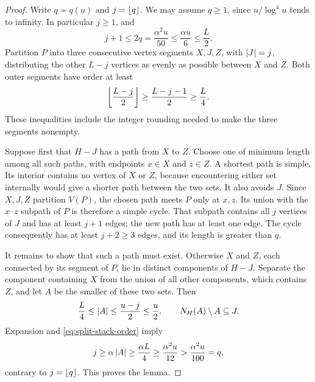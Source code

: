 \begin{proof}
Write $q=q(u)$ and $j=\left\lfloor q\right\rfloor$.  We may assume $q\ge1$, since
$u/\log^4u$ tends to infinity.  In particular $j\ge1$, and
\[
  j+1\le2q=\frac{\alpha^2u}{50}
       \le\frac{\alpha u}{6}\le\frac L2.
\]
Partition $P$ into three consecutive vertex segments $X,J,Z$, with
$\left|J\right|=j$, distributing the other $L-j$ vertices as evenly as
possible between $X$ and $Z$.  Both outer segments have order at least
\[
  \left\lfloor\frac{L-j}{2}\right\rfloor
    \ge\frac{L-j-1}{2}\ge\frac L4.
\]
These inequalities include the integer rounding needed to make the
three segments nonempty.

Suppose first that $H-J$ has a path from $X$ to $Z$.  Choose one of
minimum length among all such paths, with endpoints $x\in X$ and
$z\in Z$.  A shortest path is simple.  Its interior contains no vertex
of $X$ or $Z$, because encountering either set internally would give a
shorter path between the two sets.  It also avoids $J$.  Since
$X,J,Z$ partition $V(P)$, the chosen path meets $P$ only at $x,z$.
Its union with the $x$--$z$ subpath of $P$ is therefore a simple cycle.
That subpath contains all $j$ vertices of $J$ and has at least $j+1$
edges; the new path has at least one edge.  The cycle consequently has
at least $j+2\ge3$ edges, and its length is greater than $q$.

It remains to show that such a path must exist.  Otherwise $X$ and
$Z$, each connected by its segment of $P$, lie in distinct components
of $H-J$.  Separate the component containing $X$ from the union of all
other components, which contains $Z$, and let $A$ be the smaller of
these two sets.  Then
\[
  \frac L4\le\left|A\right|\le\frac{u-j}{2}\le\frac u2,
  \qquad N_H(A)\setminus A\subseteq J.
\]
Expansion and \eqref{eq:split-stack-order} imply
\[
  j\ge\alpha\left|A\right|\ge\frac{\alpha L}{4}
    \ge\frac{\alpha^2u}{12}
    >\frac{\alpha^2u}{100}=q,
\]
contrary to $j=\left\lfloor q\right\rfloor$.  This proves the lemma.
\end{proof}

